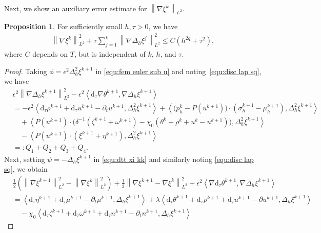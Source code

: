 \documentclass[11pt, reqno]{amsart}
\theoremstyle{definition}
\newtheorem{proposition}[theorem]{Proposition}
\numberwithin{equation}{section}
\newcommand{\dtt}{\mathrm{d}_\tau}
\newcommand{\norm}[2]{\left\|{#1}\right\|_{#2}}
\newcommand{\inpro}[2]{\left\langle#1,#2\right\rangle}
\begin{document}
Next, we show an auxiliary error estimate for $\norm{\nabla \xi^k}{L^2}$.


\begin{proposition}
For sufficiently small $h,\tau>0$, we have
\begin{align}\label{equ:error xi H1}
    \norm{\nabla \xi^k}{L^2}^2
    +
    \tau \sum_{j=1}^k \norm{\nabla \Delta_h \xi^j}{L^2}^2 
		\leq C(h^{2q}+ \tau^2),
\end{align}
where $C$ depends on $T$, but is independent of $k$, $h$, and $\tau$.
\end{proposition}

\begin{proof}
Taking $\phi=\epsilon^2 \Delta_h^2 \xi^{k+1}$ in \eqref{equ:fem euler sub u} and noting~\eqref{equ:disc lap sq}, we have
\begin{align}\label{equ:ep nab Delta xi}
    &\epsilon^2 \norm{\nabla\Delta_h \xi^{k+1}}{L^2}^2
    -
    \epsilon^2 \inpro{\dtt \nabla \theta^{k+1}}{\nabla\Delta_h \xi^{k+1}}
    \nonumber\\
    &=
    -\epsilon^2 \inpro{\dtt \rho^{k+1}+ \dtt u^{k+1}-\partial_t u^{k+1}}{\Delta_h^2 \xi^{k+1}}
    +
	\inpro{\big(p_h^k-P(u^{k+1})\big)\cdot (\sigma_h^{k+1}-\mu_h^{k+1})}{\Delta_h^2 \xi^{k+1}}
		\nonumber\\
		&\quad
		+
		\inpro{P(u^{k+1})\cdot \big(\delta^{-1}(\zeta^{k+1}+\omega^{k+1}) - \chi_0(\theta^k+\rho^k+u^k-u^{k+1})\big)}{\Delta_h^2 \xi^{k+1}}
		\nonumber\\
		&\quad
		- \inpro{P(u^{k+1})\cdot (\xi^{k+1}+\eta^{k+1})}{\Delta_h^2 \xi^{k+1}}
        \nonumber\\
        &=:Q_1+Q_2+Q_3+Q_4.
\end{align}
Next, setting $\psi=-\Delta_h \xi^{k+1}$ in \eqref{equ:dtt xi kk} and similarly noting \eqref{equ:disc lap sq}, we obtain
\begin{align}\label{equ:nab xi L2}
    &\frac12 \left(\norm{\nabla \xi^{k+1}}{L^2}^2 - \norm{\nabla \xi^k}{L^2}^2 \right)
    +
    \frac12 \norm{\nabla \xi^{k+1}-\nabla \xi^k}{L^2}^2
    +
    \epsilon^2 \inpro{\nabla \dtt \theta^{k+1}}{\nabla \Delta_h \xi^{k+1}}
    \nonumber\\
    &=
    \inpro{\dtt \eta^{k+1}+ \dtt \mu^{k+1}- \partial_t \mu^{k+1}}{\Delta_h \xi^{k+1}}
    +
    \lambda \inpro{\dtt \theta^{k+1} + \dtt \rho^{k+1} + \dtt u^{k+1}- \partial u^{k+1}}{\Delta_h \xi^{k+1}} 
    \nonumber\\
    &\quad
    -
    \chi_0 \inpro{\dtt \zeta^{k+1}+ \dtt \omega^{k+1} + \dtt n^{k+1}- \partial_t n^{k+1}}{\Delta_h \xi^{k+1}}

\end{align}
\end{proof}
\end{document}
